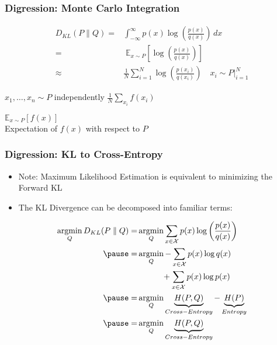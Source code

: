 \documentclass{beamer}
\DeclareMathOperator*{\argmin}{argmin}
\begin{document}
\begin{frame}
  \frametitle{Digression: Monte Carlo Integration}
    \begin{equation*}
      \begin{aligned}
      D_{KL} (P \parallel Q) =& \int_{-\infty}^{\infty} p(x)\log \left({\frac {p(x)}{q(x)}}\right)\,dx \\
      =& \; \mathbb{E}_{x \sim P} \left[ \log \left( \frac{p(x)}{q(x)} \right) \right] \\
      \approx& \frac{1}{N}\sum_{i=1}^{N} \log \left( \frac{p(x_i)}{q(x_i)} \right) \quad x_i \sim P \vert_{i=1}^{N}
      \end{aligned}
    \end{equation*}
    \begin{algorithm}[H]
    \begin{algorithmic}[1]
      \STATE $x_1, \hdots, x_n \sim P$ independently
      \RETURN $\frac{1}{N}\sum_{x_i} f(x_i)$
    \end{algorithmic}
    \caption{$\mathbb{E}_{x \sim P}[f(x)]$\\Expectation of $f(x)$ with respect to $P$}
    \end{algorithm}
\end{frame}


\begin{frame}
  \frametitle{Digression: KL to Cross-Entropy}
  \begin{itemize}
    \item Note: Maximum Likelihood Estimation is equivalent to minimizing the Forward KL
    \pause
    \item The KL Divergence can be decomposed into familiar terms:
  \end{itemize}
  \begin{equation*}
    \begin{aligned}
      \argmin_{Q} D_{KL} (P \parallel Q) =& \argmin_{Q} \sum_{x \in \mathcal {X}} p(x)\log \left({\frac {p(x)}{q(x)}}\right) \\
      \pause
      =& \argmin_{Q} - \sum_{x \in \mathcal {X}} p(x)\log q(x) \\
      & \quad\quad\quad + \sum_{x \in \mathcal {X}} p(x)\log p(x) \\
      \pause
      =& \argmin_{Q} \underbrace{H(P, Q)}_{Cross-Entropy} - \underbrace{H(P)}_{Entropy} \\
      \pause
      =& \argmin_{Q} \underbrace{H(P, Q)}_{Cross-Entropy}
    \end{aligned}
  \end{equation*}
\end{frame}
\end{document}
